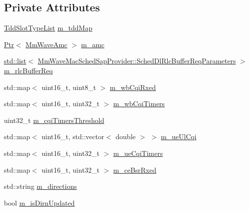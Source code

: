 \subsection*{Private Attributes}
\begin{DoxyCompactItemize}
\item 
\hyperlink{namespacens3_a74052c5410c5c8e0028017dbf985cd1f}{Tdd\+Slot\+Type\+List} \hyperlink{classns3_1_1MmWaveRrMacScheduler_adbd5d8631590dbbb160aa707757cd75c}{m\+\_\+tdd\+Map}
\item 
\hyperlink{classns3_1_1Ptr}{Ptr}$<$ \hyperlink{classns3_1_1MmWaveAmc}{Mm\+Wave\+Amc} $>$ \hyperlink{classns3_1_1MmWaveRrMacScheduler_abbcdddd7d8733f372963069e1d0395d3}{m\+\_\+amc}
\item 
\hyperlink{openflow-interface_8h_afd9bcfa176617760671b67580f536fa7}{std\+::list}$<$ \hyperlink{structns3_1_1MmWaveMacSchedSapProvider_1_1SchedDlRlcBufferReqParameters}{Mm\+Wave\+Mac\+Sched\+Sap\+Provider\+::\+Sched\+Dl\+Rlc\+Buffer\+Req\+Parameters} $>$ \hyperlink{classns3_1_1MmWaveRrMacScheduler_a4808ca626b0b12682c3f1a079d016997}{m\+\_\+rlc\+Buffer\+Req}
\item 
std\+::map$<$ uint16\+\_\+t, uint8\+\_\+t $>$ \hyperlink{classns3_1_1MmWaveRrMacScheduler_ab048c846f6d5d71795b65b9f91c6766a}{m\+\_\+wb\+Cqi\+Rxed}
\item 
std\+::map$<$ uint16\+\_\+t, uint32\+\_\+t $>$ \hyperlink{classns3_1_1MmWaveRrMacScheduler_ae70383b2b2b66701ea96205d5ad60c41}{m\+\_\+wb\+Cqi\+Timers}
\item 
uint32\+\_\+t \hyperlink{classns3_1_1MmWaveRrMacScheduler_a21360d09f2e5e4b9fc304752aef8ae6a}{m\+\_\+cqi\+Timers\+Threshold}
\item 
std\+::map$<$ uint16\+\_\+t, std\+::vector$<$ double $>$ $>$ \hyperlink{classns3_1_1MmWaveRrMacScheduler_aeb890d54a9f369fe677a64efa78d2402}{m\+\_\+ue\+Ul\+Cqi}
\item 
std\+::map$<$ uint16\+\_\+t, uint32\+\_\+t $>$ \hyperlink{classns3_1_1MmWaveRrMacScheduler_a48957bee7e937b6d8627194fa429a473}{m\+\_\+ue\+Cqi\+Timers}
\item 
std\+::map$<$ uint16\+\_\+t, uint32\+\_\+t $>$ \hyperlink{classns3_1_1MmWaveRrMacScheduler_a2ebec374f1ff5014f115ff8b68ff5ebb}{m\+\_\+ce\+Bsr\+Rxed}
\item 
std\+::string \hyperlink{classns3_1_1MmWaveRrMacScheduler_ac4c00a9f08cd90ac861753f28c9d6a69}{m\+\_\+directions}
\item 
bool \hyperlink{classns3_1_1MmWaveRrMacScheduler_ac45c41dd1fc03ca53d6580cf1dfca939}{m\+\_\+is\+Dirn\+Updated}
\item 

\end{DoxyCompactItemize}
